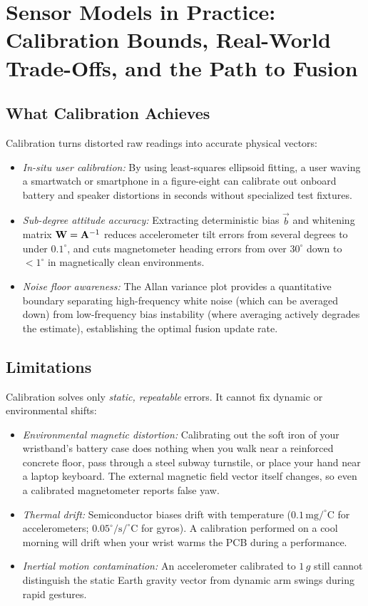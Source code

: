 \section{Sensor Models in Practice: Calibration Bounds, Real-World Trade-Offs, and the Path to Fusion}
\label{ch35:capabilities-limits}

\subsection{What Calibration Achieves}
Calibration turns distorted raw readings into accurate physical vectors:
\begin{itemize}
  \item \emph{In-situ user calibration:} By using least-squares ellipsoid fitting, a user waving a smartwatch or smartphone in a figure-eight can calibrate out onboard battery and speaker distortions in seconds without specialized test fixtures.
  \item \emph{Sub-degree attitude accuracy:} Extracting deterministic bias $\vec{b}$ and whitening matrix $\mathbf{W} = \mathbf{A}^{-1}$ reduces accelerometer tilt errors from several degrees to under $0.1^\circ$, and cuts magnetometer heading errors from over $30^\circ$ down to $<1^\circ$ in magnetically clean environments.
  \item \emph{Noise floor awareness:} The Allan variance plot provides a quantitative boundary separating high-frequency white noise (which can be averaged down) from low-frequency bias instability (where averaging actively degrades the estimate), establishing the optimal fusion update rate.
\end{itemize}

\subsection{Limitations}
Calibration solves only \emph{static, repeatable} errors. It cannot fix dynamic or environmental shifts:
\begin{itemize}
  \item \emph{Environmental magnetic distortion:} Calibrating out the soft iron of your wristband's battery case does nothing when you walk near a reinforced concrete floor, pass through a steel subway turnstile, or place your hand near a laptop keyboard. The external magnetic field vector itself changes, so even a calibrated magnetometer reports false yaw.
  \item \emph{Thermal drift:} Semiconductor biases drift with temperature ($0.1\,\text{mg}/^\circ\text{C}$ for accelerometers; $0.05^\circ/\text{s}/^\circ\text{C}$ for gyros). A calibration performed on a cool morning will drift when your wrist warms the PCB during a performance.
  \item \emph{Inertial motion contamination:} An accelerometer calibrated to $1\,g$ still cannot distinguish the static Earth gravity vector from dynamic arm swings during rapid gestures.
\end{itemize}

